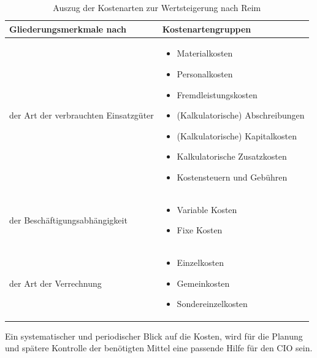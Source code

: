 \begin{table}[h!]
\begin{tabularx}{\textwidth}{|X|X|}
	\hline \textbf{Gliederungsmerkmale nach} & \textbf{Kostenartengruppen} \\ 
	\hline der Art der verbrauchten Einsatzgüter & \begin{itemize}
		\item Materialkosten
		\item Personalkosten
		\item Fremdleistungskosten
		\item (Kalkulatorische) Abschreibungen
		\item (Kalkulatorische) Kapitalkosten
		\item Kalkulatorische Zusatzkosten
		\item Kostensteuern und Gebühren
	\end{itemize} \\ 
	\hline der Beschäftigungsabhängigkeit & \begin{itemize}
		\item Variable Kosten
		\item Fixe Kosten
	\end{itemize} \\ 
	\hline der Art der Verrechnung & \begin{itemize}
		\item Einzelkosten
		\item Gemeinkosten
		\item Sondereinzelkosten
	\end{itemize} \\ 
	\hline 
\end{tabularx}
	\caption{Auszug der Kostenarten zur Wertsteigerung nach Reim}
	\label{tab_gliederung_kostenarten}
\end{table}

Ein systematischer und periodischer Blick auf die Kosten, wird f\"ur die Planung und sp\"atere Kontrolle der ben\"otigten Mittel eine passende Hilfe f\"ur den CIO sein.










